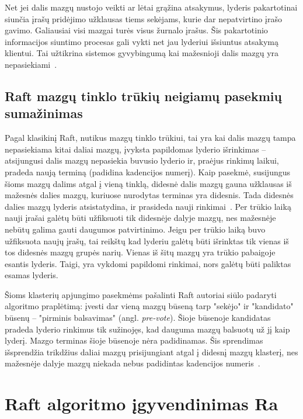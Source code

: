\documentclass{VUMIFPSkursinis}
\begin{document}
Net jei dalis mazgų nustojo veikti ar lėtai grąžina atsakymus, lyderis pakartotinai siunčia įrašų pridėjimo užklausas tiems sekėjams, kurie dar nepatvirtino įrašo gavimo. Galiausiai visi mazgai turės visus žurnalo įrašus. Šis pakartotinio informacijos siuntimo procesas gali vykti net jau lyderiui išsiuntus atsakymą klientui. Tai užtikrina sistemos gyvybingumą kai mažesnioji dalis mazgų yra nepasiekiami~\cite{ongaro_consensus}.

\subsection{Raft mazgų tinklo trūkių neigiamų pasekmių sumažinimas}

Pagal klasikinį Raft, nutikus mazgų tinklo trūkiui, tai yra kai dalis mazgų tampa nepasiekiama kitai daliai mazgų, įvyksta papildomas lyderio išrinkimas -- atsijungusi dalis mazgų nepasiekia buvusio lyderio ir, praėjus rinkimų laikui, pradeda naują terminą (padidina kadencijos numerį). Kaip pasekmė, susijungus šioms mazgų dalims atgal į vieną tinklą, didesnė dalis mazgų gauna užklausas iš mažesnės dalies mazgų, kuriuose nurodytas terminas yra didesnis. Tada didesnės dalies mazgų lyderis atsistatydina, ir prasideda nauji rinkimai~\cite{ongaro_consensus}. Per trūkio laiką nauji įrašai galėtų būti užfiksuoti tik didesnėje dalyje mazgų, nes mažesnėje nebūtų galima gauti daugumos patvirtinimo. Jeigu per trūkio laiką buvo užfiksuota naujų įrašų, tai reikštų kad lyderiu galėtų būti išrinktas tik vienas iš tos didesnės mazgų grupės narių. Vienas iš šitų mazgų yra trūkio pabaigoje esantis lyderis. Taigi, yra vykdomi papildomi rinkimai, nors galėtų būti paliktas esamas lyderis.

Šioms klasterių apjungimo pasekmėms pašalinti Raft autoriai siūlo padaryti algoritmo praplėtimą: įvesti dar vieną mazgų būseną tarp "sekėjo" ir "kandidato" būsenų -- "pirminis balsavimas" (angl. \textit{pre-vote}). Šioje būsenoje kandidatas pradeda lyderio rinkimus tik sužinojęs, kad dauguma mazgų balsuotų už jį kaip lyderį. Mazgo terminas šioje būsenoje nėra padidinamas. Šis sprendimas išsprendžia trikdžius daliai mazgų prisijungiant atgal į didesnį mazgų klasterį, nes mažesnėje dalyje mazgų niekada nebus padidintas kadencijos numeris~\cite{ongaro_consensus}.

\section{Raft algoritmo įgyvendinimas Ra}
\end{document}
